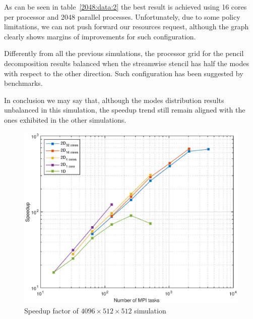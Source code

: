 As can be seen in table~\ref{2048:data:2} the best result is achieved using 16 cores per processor and 2048 parallel processes. Unfortunately, due to some policy limitations, we can not push forward our resources request, although the graph clearly shows margins of improvements for such configuration.\\
\par
Differently from all the previous simulations, the processor grid for the pencil decomposition results balanced when the streamwise stencil has half the modes with respect to the other direction. Such configuration has been suggested by benchmarks.
\par
In conclusion we may say that, although the modes distribution results unbalanced in this simulation, the speedup trend still remain aligned with the ones exhibited in the other simulations.
\begin{figure}
\begin{center}
\includegraphics[scale=0.55]{grafici/20482}
\caption{Speedup factor of $4096\times512 \times512$ simulation}
\label{20482}
\end{center}
\end{figure}





